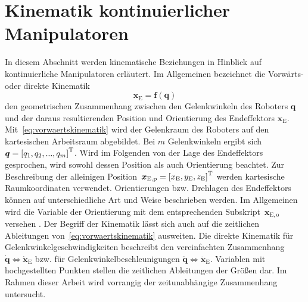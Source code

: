 \pagebreak
\section{Kinematik kontinuierlicher Manipulatoren}
\label{sec:kinematikAllgemein}

In diesem Abschnitt werden kinematische Beziehungen in Hinblick auf kontinuierliche Manipulatoren erläutert. Im Allgemeinen bezeichnet die Vorwärts- oder direkte Kinematik 
%
\begin{equation}
\label{eq:vorwaertskinematik}
\bm{x}_\mathrm{E} = \bm{f}(\bm{q}) 
\end{equation}
%
den geometrischen Zusammenhang zwischen den Gelenkwinkeln des Roboters $\bm{q}$ und der daraus resultierenden Position und Orientierung des Endeffektors $\bm{x}_\mathrm{E}$. Mit~\eqref{eq:vorwaertskinematik} wird der Gelenkraum des Roboters auf den kartesischen Arbeitsraum abgebildet. Bei $m$ Gelenkwinkeln ergibt sich $\bm{q} = \left[q_1, q_2, ..., q_m \right]^{\mathrm{T}}$. Wird im Folgenden von der Lage des Endeffektors gesprochen, wird sowohl dessen Position als auch Orientierung beachtet. 
Zur Beschreibung der alleinigen Position~$\bm{x}_{\mathrm{E,p}} = \left[ x_\mathrm{E}, y_\mathrm{E}, z_\mathrm{E} \right]^{\mathrm{T}}$ werden kartesische Raumkoordinaten verwendet.
Orientierungen bzw. Drehlagen des Endeffektors können auf unterschiedliche Art und Weise beschrieben werden. Im Allgemeinen wird die Variable der Orientierung mit dem entsprechenden Subskript~$\bm{x}_{\mathrm{E,o}}$ versehen .
Der Begriff der Kinematik lässt sich auch auf die zeitlichen Ableitungen von~\eqref{eq:vorwaertskinematik} ausweiten. Die direkte Kinematik für Gelenkwinkelgeschwindigkeiten beschreibt den vereinfachten Zusammenhang \mbox{$\bm{\dot{q}} \Leftrightarrow \bm{\dot{x}}_\mathrm{E}$} bzw. für Gelenkwinkelbeschleunigungen \mbox{$\bm{\ddot{q}} \Leftrightarrow \bm{\ddot{x}}_\mathrm{E}$}. Variablen mit hochgestellten Punkten stellen die zeitlichen Ableitungen der Größen dar. 
Im Rahmen dieser Arbeit wird vorrangig der zeitunabhängige Zusammenhang untersucht. 

